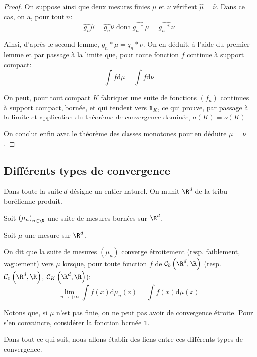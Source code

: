 \begin{proof}
On suppose ainsi que deux mesures finies $\mu$ et $\nu$ vérifient $\widehat{\mu} = \widehat{\nu}$. Dans ce cas, on a, pour tout $n$:
\[
\widehat{g_n}\widehat{\mu} = \widehat{g_n}\widehat{\nu} \text{ donc }\widehat{g_n * \mu} = \widehat{g_n * \nu}
\]

Ainsi, d'après le second lemme, $g_n*\mu = g_n*\nu$. On en déduit, à l'aide du premier lemme et par passage à la limite que, pour toute fonction $f$ continue à support compact:
\[
\displaystyle{\int} f \mathrm d \mu = \displaystyle{\int} f \mathrm d \nu 
\]

On peut, pour tout compact $K$ fabriquer une suite de fonctions $(f_n)$ continues à support compact, bornée, et qui tendent vers $\mathbb{1}_K$, ce qui prouve, par passage à la limite et application du théorème de convergence dominée, $\mu(K) = \nu(K)$.

\medskip
On conclut enfin avec le théorème des classes monotones pour en déduire $\mu = \nu$.
\end{proof}

\subsection{Différents types de convergence}

Dans toute la suite $d$ désigne un entier naturel. On munit $\R^d$ de la tribu borélienne produit.

\begin{de}
Soit $\left(\mu_n\right)_{n \in \N}$ une suite de mesures bornées sur $\R^d$.

Soit $\mu$ une mesure sur $\R^d$.

On dit que la suite de mesures $(\mu_n)$ converge étroitement (resp. faiblement, vaguement) vers $\mu$ lorsque, pour toute fonction $f$ de $\mathcal{C}_b\left(\R^d,\R\right)$ (resp. $\mathcal{C}_0\left(\R^d,\R\right)$, $\mathcal{C}_K\left(\R^d,\R\right)$):
\[
\lim \limits_{n \to +\infty} \displaystyle{\int} f(x) \mathrm d \mu_n(x) = \displaystyle{\int} f(x) \mathrm d \mu(x)
\]
\end{de}




\begin{listremarques}
\item
Notons que, si $\mu$ n'est pas finie, on ne peut pas avoir de convergence étroite. Pour s'en convaincre, considérer la fonction bornée $\mathbb{1}$.
\item
Dans tout ce qui suit, nous allons établir des liens entre ces différents types de convergence.
\end{listremarques}

